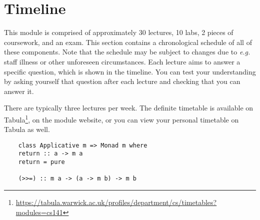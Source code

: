 
\section{Timeline}
\label{sec:timeline}

This module is comprised of approximately 30 lectures, 10 labs, 2 pieces of coursework, and an exam. This section contains a chronological schedule of all of these components. Note that the schedule may be subject to changes due to \emph{e.g.} staff illness or other unforeseen circumstances. Each lecture aims to answer a specific question, which is shown in the timeline. You can test your understanding by asking yourself that question after each lecture and checking that you can answer it. 

There are typically three lectures per week. The definite timetable is available on Tabula\footnote{\url{https://tabula.warwick.ac.uk/profiles/department/cs/timetables?modules=cs141}}, on the module website, or you can view your personal timetable on Tabula as well. 

\newcommand{\foo}{\makebox[0pt]{\textbullet}\hskip-0.5pt\vrule width 1pt\hspace{\labelsep}}

\newcommand{\LectureEntry}[4]{#1 & \begin{tabular}{p{11cm}}
		\textbf{#2} \\
		\emph{#3} \\
		#4
\end{tabular}}
\newcommand{\LabEntry}[3]{#1 & \begin{tabular}{p{11cm}}
		\textbf{#2} \\
		#3
\end{tabular}}

\begin{verbatim}
    class Applicative m => Monad m where 
    return :: a -> m a 
    return = pure 
    
    (>>=) :: m a -> (a -> m b) -> m b
\end{verbatim}

